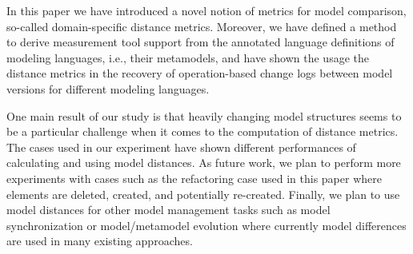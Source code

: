 In this paper we have introduced a novel notion of metrics for model comparison, so-called domain-specific distance metrics. Moreover, we have defined a method to derive measurement tool support from the annotated language definitions of modeling languages, i.e., their metamodels, and have shown the usage the distance metrics in the recovery of operation-based change logs between model versions for different modeling languages.

One main result of our study is that heavily changing model structures seems to be a particular challenge when it comes to the computation of distance metrics. The cases used in our experiment have shown different performances of calculating and using model distances. As future work, we plan to perform more experiments with cases such as the refactoring case used in this paper where elements are deleted, created, and potentially re-created. Finally, we plan to use model distances for other model management tasks such as model synchronization or model/metamodel evolution where currently model differences are used in many existing approaches. 